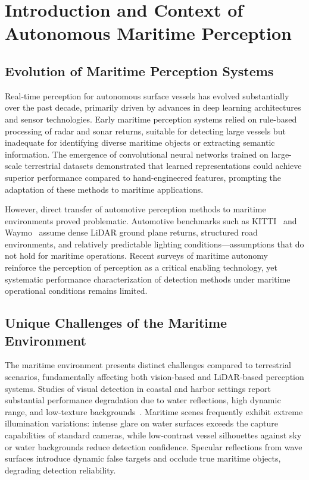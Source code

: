 \documentclass[../main.tex]{subfiles}
\begin{document}
\section{Introduction and Context of Autonomous Maritime Perception}

\subsection{Evolution of Maritime Perception Systems}

Real-time perception for autonomous surface vessels has evolved substantially over the past decade, primarily driven by advances in deep learning architectures and sensor technologies.
Early maritime perception systems relied on rule-based processing of radar and sonar returns, suitable for detecting large vessels but inadequate for identifying diverse maritime objects or extracting semantic information.
The emergence of convolutional neural networks trained on large-scale terrestrial datasets demonstrated that learned representations could achieve superior performance compared to hand-engineered features, prompting the adaptation of these methods to maritime applications.

However, direct transfer of automotive perception methods to maritime environments proved problematic.
Automotive benchmarks such as KITTI~\cite{geiger2013} and Waymo~\cite{sun2020} assume dense \ac{LiDAR} ground plane returns, structured road environments, and relatively predictable lighting conditions---assumptions that do not hold for maritime operations.
Recent surveys of maritime autonomy~\cite{bae2023, zhang2021, xue2025, ferreira2022, bai2022} reinforce the perception of perception as a critical enabling technology, yet systematic performance characterization of detection methods under maritime operational conditions remains limited.

\subsection{Unique Challenges of the Maritime Environment}

The maritime environment presents distinct challenges compared to terrestrial scenarios, fundamentally affecting both vision-based and \ac{LiDAR}-based perception systems.
Studies of visual detection in coastal and harbor settings report substantial performance degradation due to water reflections, high dynamic range, and low-texture backgrounds~\cite{prasad2017}.
Maritime scenes frequently exhibit extreme illumination variations: intense glare on water surfaces exceeds the capture capabilities of standard cameras, while low-contrast vessel silhouettes against sky or water backgrounds reduce detection confidence.
Specular reflections from wave surfaces introduce dynamic false targets and occlude true maritime objects, degrading detection reliability.
\end{document}
